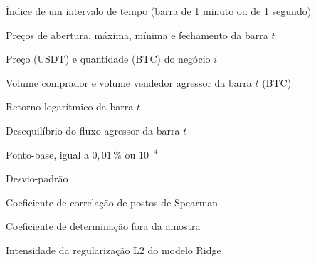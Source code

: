 \documentclass[
  12pt,
  openany,
  oneside,
  a4paper,
  chapter=TITLE,
  section=TITLE,
  english,
  brazil,
  sumario=tradicional
]{abntex2}
\begin{document}
\begin{simbolos}
  \item[$t$] Índice de um intervalo de tempo (barra de 1 minuto ou de 1 segundo)
  \item[$O_t, H_t, L_t, C_t$] Preços de abertura, máxima, mínima e fechamento da barra $t$
  \item[$p_i, q_i$] Preço (USDT) e quantidade (BTC) do negócio $i$
  \item[$V_t^{c}, V_t^{v}$] Volume comprador e volume vendedor agressor da barra $t$ (BTC)
  \item[$r_t$] Retorno logarítmico da barra $t$
  \item[$\mathrm{OFI}_t$] Desequilíbrio do fluxo agressor da barra $t$
  \item[$\mathrm{bps}$] Ponto-base, igual a $0,01\,\%$ ou $10^{-4}$
  \item[$\sigma$] Desvio-padrão
  \item[$\rho$] Coeficiente de correlação de postos de Spearman
  \item[$R^2$] Coeficiente de determinação fora da amostra
  \item[$\alpha$] Intensidade da regularização L2 do modelo Ridge
\end{simbolos}

\tableofcontents*
\cleardoublepage

\textual
\pagestyle{abntchapfirst} %














\postextual



\begin{apendicesenv}

\end{apendicesenv}
\end{document}
